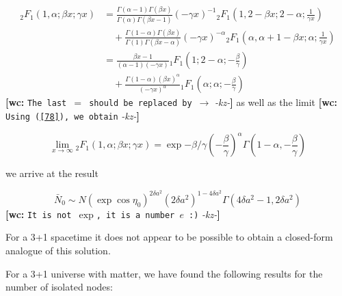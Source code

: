 \documentclass[preprint,notitlepage,amsmath,amssymb,floatfix]{revtex4-1}
\newcommand{\XXX}[3]{{\bf [#1: } {\tt #3} {\it -#2-}{\bf ]}}
\begin{document}
\begin{equation}
\begin{split}
{}_2F_1\left(1,\alpha;\beta x;\gamma x\right) &= \frac{\Gamma\left(\alpha-1\right)\Gamma\left(\beta x\right)}{\Gamma\left(\alpha\right)\Gamma\left(\beta x-1\right)}\left(-\gamma x\right)^{-1} {}_2F_1\left(1,2-\beta x;2-\alpha;\frac{1}{\gamma x}\right) \\
&\quad + \frac{\Gamma\left(1-\alpha\right)\Gamma\left(\beta x\right)}{\Gamma\left(1\right)\Gamma\left(\beta x-\alpha\right)}\left(-\gamma x\right)^{-\alpha} {}_2F_1\left(\alpha,\alpha+1-\beta x;\alpha;\frac{1}{\gamma x}\right) \\
&= \frac{\beta x-1}{\left(\alpha-1\right)\left(-\gamma x\right)} {}_1F_1\left(1;2-\alpha;-\frac{\beta}{\gamma}\right) \\
&\quad + \frac{\Gamma\left(1-\alpha\right)\left(\beta x\right)^\alpha}{\left(-\gamma x\right)^\alpha} {}_1F_1\left(\alpha;\alpha;-\frac{\beta}{\gamma}\right)
\end{split}
\end{equation}
\XXX{wc}{kz}{The last $=$ should be replaced by $\rightarrow$}
\noindent as well as the limit \XXX{wc}{kz}{Using (\ref{78}), we obtain}

\begin{equation}
\lim_{x\to\infty} {}_2F_1\left(1,\alpha;\beta x;\gamma x\right) = \exp{-\beta/\gamma}\left(-\frac{\beta}{\gamma}\right)^\alpha\Gamma\left(1-\alpha,-\frac{\beta}{\gamma}\right)
\end{equation}

\noindent we arrive at the result

\begin{equation}
\bar{N}_0 \sim N\left(\exp{}\cos\eta_0\right)^{2\delta a^2}\left(2\delta a^2\right)^{1-4\delta a^2}\Gamma\left(4\delta a^2-1,2\delta a^2\right)
\end{equation}
\XXX{wc}{kz}{It is not $\exp$, it is a number $e$ :)}

\noindent For a 3+1 spacetime it does not appear to be possible to obtain a closed-form analogue of this solution.  


\par For a 3+1 universe with matter, we have found the following results for the number of isolated nodes:
\end{document}
